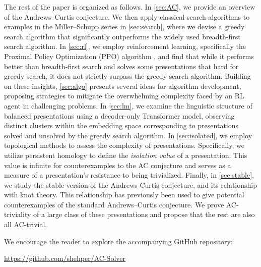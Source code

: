 \medskip The rest of the paper is organized as follows. In \cref{sec:AC}, we provide an overview of the Andrews--Curtis conjecture. We then apply classical search algorithms to examples in the Miller--Schupp series in \cref{sec:search}, where we devise a greedy search algorithm that significantly outperforms the widely used breadth-first search algorithm. In \cref{sec:rl}, we employ reinforcement learning, specifically the Proximal Policy Optimization (PPO) algorithm \cite{schulman2017proximal}, and find that while it performs better than breadth-first search and solves some presentations that hard for greedy search, it does not strictly surpass the greedy search algorithm.
Building on these insights, \cref{sec:algo} presents several ideas for algorithm development, proposing strategies to mitigate the overwhelming complexity faced by an RL agent in challenging problems.
In \cref{sec:lm}, we examine the linguistic structure of balanced presentations using a decoder-only Transformer model, observing distinct clusters within the embedding space corresponding to presentations solved and unsolved by the greedy search algorithm.
In \cref{sec:isolated}, we employ topological methods to assess the complexity of presentations. Specifically, we utilize persistent homology to define the \textit{isolation value} of a presentation. This value is infinite for counterexamples to the AC conjecture and serves as a measure of a presentation's resistance to being trivialized. Finally, in \cref{sec:stable}, we study the stable version of the Andrews-Curtis conjecture, and its relationship with knot theory.
This relationship has previously been used to give potential counterexamples of the standard Andrews--Curtis conjecture. We prove AC-triviality of a large class of these presentations and propose that the rest are also all AC-trivial. 

\medskip\noindent
We encourage the reader to explore the accompanying GitHub repository:
\begin{center}
	\href{https://github.com/shehper/AC-Solver}{https://github.com/shehper/AC-Solver}
\end{center}